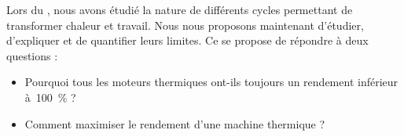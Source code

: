 Lors du \courssix, nous avons étudié la nature de différents cycles permettant de transformer chaleur et travail. Nous nous proposons maintenant d’étudier, d’expliquer et de quantifier leurs limites. Ce \courssept se propose de répondre à deux questions :
\begin{itemize}
	\item Pourquoi tous les moteurs thermiques ont-ils toujours un rendement inférieur à~\SI{100}{\percent} ?
	\item Comment maximiser le rendement d’une machine thermique ?
\end{itemize}
